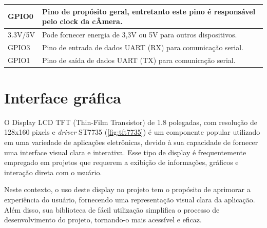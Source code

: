 \begin{tabframed}[htb]
\begin{tabular}{|l|l|}
        GPIO0          & Pino de propósito geral, entretanto este pino é responsável pelo clock da cÂmera.           \\ \hline
        3.3V/5V        & Pode fornecer energia de 3,3V ou 5V para outros dispositivos.                               \\ \hline
        GPIO3          & Pino de entrada de dados UART (RX) para comunicação serial.                                 \\ \hline
        GPIO1          & Pino de saída de dados UART (TX) para comunicação serial.                                   \\ \hline
    \end{tabular}
    \fonte{}%
\end{tabframed}

\section{Interface gráfica}\label{sec:interface}

O Display LCD TFT (Thin-Film Transistor) de 1.8 polegadas, 
com resolução de 128x160 pixels
e \textit{driver} ST7735 (\autoref{fig:tft7735}) é um componente popular 
utilizado em uma variedade de aplicações eletrônicas, devido à sua 
capacidade de fornecer uma interface visual clara e interativa. 
Esse tipo de display é frequentemente empregado em projetos que requerem 
a exibição de informações, gráficos e interação direta com o usuário.

Neste contexto, o uso deste display no projeto tem o propósito de aprimorar 
a experiência do usuário, fornecendo uma representação visual clara da 
aplicação. Além disso, sua biblioteca de fácil utilização simplifica o 
processo de desenvolvimento do projeto, tornando-o mais acessível e eficaz.

